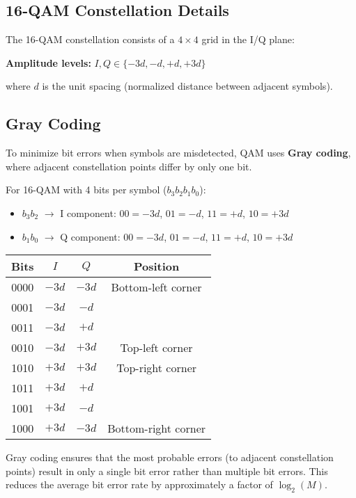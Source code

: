 \subsection{16-QAM Constellation Details}

The 16-QAM constellation consists of a $4 \times 4$ grid in the I/Q plane:

\textbf{Amplitude levels:} $I, Q \in \{-3d, -d, +d, +3d\}$

where $d$ is the unit spacing (normalized distance between adjacent symbols).

\subsection{Gray Coding}

To minimize bit errors when symbols are misdetected, QAM uses \textbf{Gray coding}, where adjacent constellation points differ by only one bit.

For 16-QAM with 4 bits per symbol ($b_3 b_2 b_1 b_0$):
\begin{itemize}
\item $b_3 b_2$ $\rightarrow$ I component: $00 = -3d$, $01 = -d$, $11 = +d$, $10 = +3d$
\item $b_1 b_0$ $\rightarrow$ Q component: $00 = -3d$, $01 = -d$, $11 = +d$, $10 = +3d$
\end{itemize}

\begin{center}
\begin{tabular}{@{}cccc@{}}
\toprule
Bits & $I$ & $Q$ & Position \\
\midrule
0000 & $-3d$ & $-3d$ & Bottom-left corner \\
0001 & $-3d$ & $-d$ & \\
0011 & $-3d$ & $+d$ & \\
0010 & $-3d$ & $+3d$ & Top-left corner \\
1010 & $+3d$ & $+3d$ & Top-right corner \\
1011 & $+3d$ & $+d$ & \\
1001 & $+3d$ & $-d$ & \\
1000 & $+3d$ & $-3d$ & Bottom-right corner \\
\bottomrule
\end{tabular}
\end{center}

\begin{keyconcept}
Gray coding ensures that the most probable errors (to adjacent constellation points) result in only a single bit error rather than multiple bit errors. This reduces the average bit error rate by approximately a factor of $\log_2(M)$.
\end{keyconcept}

